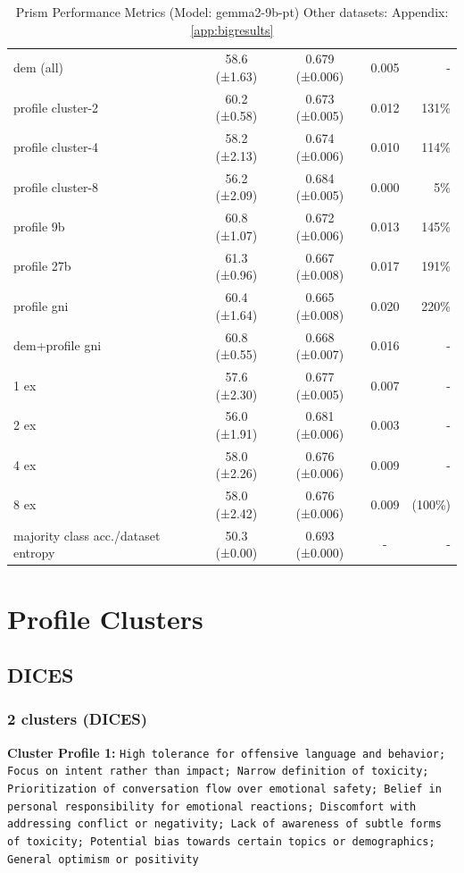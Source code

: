 \documentclass[11pt]{article}
\begin{document}
\begin{table}[h]
\begin{tabular}{|l|c|c|c|r|}
dem (all) & 58.6 (±1.63) & 0.679 (±0.006) & 0.005 & - \\
profile cluster-2 & 60.2 (±0.58) & 0.673 (±0.005) & 0.012 & 131\% \\
profile cluster-4 & 58.2 (±2.13) & 0.674 (±0.006) & 0.010 & 114\% \\
profile cluster-8 & 56.2 (±2.09) & 0.684 (±0.005) & 0.000 & 5\% \\
profile 9b & 60.8 (±1.07) & 0.672 (±0.006) & 0.013 & 145\% \\
profile 27b & 61.3 (±0.96) & 0.667 (±0.008) & 0.017 & 191\% \\
profile gni & 60.4 (±1.64) & 0.665 (±0.008) & 0.020 & 220\% \\
dem+profile gni & 60.8 (±0.55) & 0.668 (±0.007) & 0.016 & - \\
1 ex & 57.6 (±2.30) & 0.677 (±0.005) & 0.007 & - \\
2 ex & 56.0 (±1.91) & 0.681 (±0.006) & 0.003 & - \\
4 ex & 58.0 (±2.26) & 0.676 (±0.006) & 0.009 & - \\
8 ex & 58.0 (±2.42) & 0.676 (±0.006) & 0.009 & (100\%) \\
majority class acc./dataset entropy & 50.3 (±0.00) & 0.693 (±0.000) & - & - \\
\hline
\end{tabular}
\caption{Prism Performance Metrics (Model: gemma2-9b-pt) Other datasets: Appendix: \ref{app:bigresults}}
\label{tab:performance_prism}
\end{table}


\newpage
\section{Profile Clusters}

\label{app:profileclusters}


\subsection{DICES}

\subsubsection{2 clusters (DICES)}

\textbf{Cluster Profile 1:} \texttt{High tolerance for offensive language and behavior; Focus on intent rather than impact; Narrow definition of toxicity; Prioritization of conversation flow over emotional safety; Belief in personal responsibility for emotional reactions; Discomfort with addressing conflict or negativity; Lack of awareness of subtle forms of toxicity; Potential bias towards certain topics or demographics; General optimism or positivity}
\end{document}
